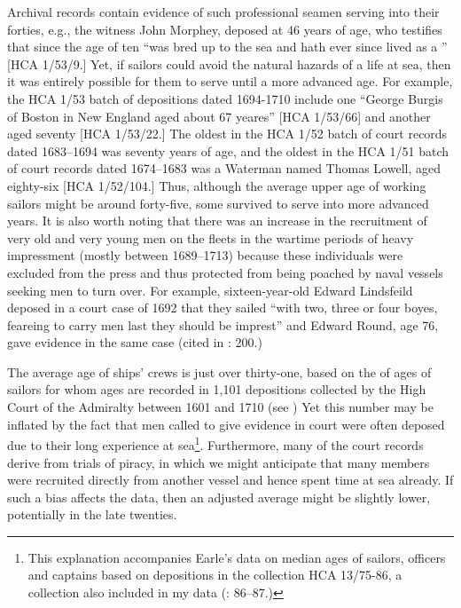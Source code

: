 Archival records contain evidence of such professional seamen serving into their forties, e.g., the witness John Morphey, deposed at 46 years of age, who testifies that since the age of ten “was bred up to the sea and hath ever since lived as a ” [HCA 1/53/9.] Yet, if sailors could avoid the natural hazards of a life at sea, then it was entirely possible for them to serve until a more advanced age. For example, the HCA 1/53 batch of depositions dated 1694-1710 include one  “George Burgis of Boston in New England  aged about 67 yeares” [HCA 1/53/66] and another aged seventy [HCA 1/53/22.] The oldest  in the HCA 1/52 batch of court records dated 1683--1694 was seventy years of age, and the oldest  in the HCA 1/51 batch of court records dated 1674--1683 was a Waterman named Thomas Lowell, aged eighty-six [HCA 1/52/104.] Thus, although the average upper age of working sailors might be around forty-five, some survived to serve into more advanced years. It is also worth noting that there was an increase in the recruitment of very old and very young men on the  fleets in the wartime periods of heavy impressment (mostly between 1689--1713) because these individuals were excluded from the press and thus protected from being poached by naval vessels seeking men to turn over. For example, sixteen-year-old Edward Lindsfeild deposed in a court case of 1692 that they sailed “with two, three or four boyes, feareing to carry men last they should be imprest” and Edward Round, age 76, gave evidence in the same case (cited in \citealt{Earle1998}: 200.) 

 The average age of ships’ crews is just over thirty-one, based on the of ages of sailors for whom ages are recorded in 1,101 depositions collected by the High Court of the Admiralty between 1601 and 1710 (see ) Yet this number may be inflated by the fact that men called to give evidence in court were often deposed due to their long experience at sea\footnote{This explanation accompanies Earle’s data on median ages of sailors, officers and captains based on depositions in the collection HCA 13/75-86, a collection also included in my data (\citealt{Earle1993}: 86--87.)}. Furthermore, many of the court records derive from trials of piracy, in which we might anticipate that many  members were recruited directly from another vessel and hence spent time at sea already. If such a bias affects the data, then an adjusted average might be slightly lower, potentially in the late twenties.


